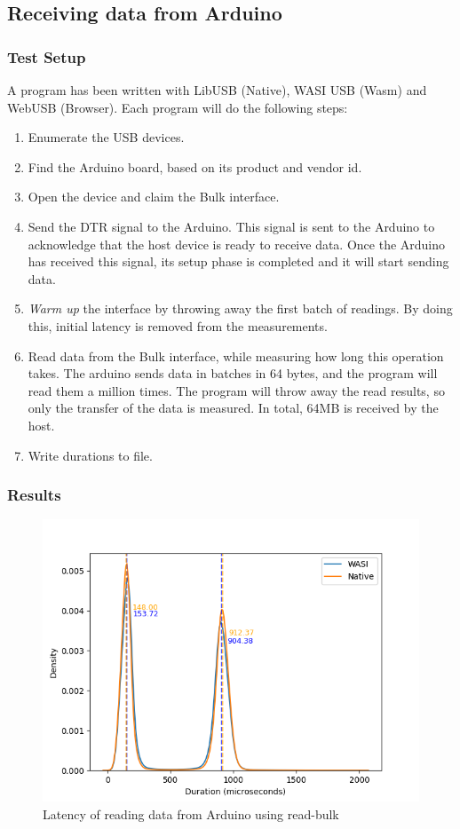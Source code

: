 \subsection{Receiving data from Arduino}

\subsubsection{Test Setup}
A program has been written with LibUSB (Native), WASI USB (Wasm) and WebUSB (Browser). Each program will do the following steps:

\begin{enumerate}
\item Enumerate the USB devices.
\item Find the Arduino board, based on its product and vendor id.
\item Open the device and claim the Bulk interface.
\item Send the \acrfull{DTR} signal to the Arduino. This signal is sent to the Arduino to acknowledge that the host device is ready to receive data. Once the Arduino has received this signal, its setup phase is completed and it will start sending data.
\item \textit{Warm up } the interface by throwing away the first batch of readings. By doing this, initial latency is removed from the measurements.
\item Read data from the Bulk interface, while measuring how long this operation takes. The arduino sends data in batches in 64 bytes, and the program will read them a million times. The program will throw away the read results, so only the transfer of the data is measured. In total, 64MB is received by the host.
\item Write durations to file.
\end{enumerate}

\subsubsection{Results}
\begin{figure}[H]
  \centering
  \includegraphics[width=1\textwidth]{images/reading_data_latency.png}
  \caption{Latency of reading data from Arduino using read-bulk}
  \label{fig:arduino_reading_latency}
\end{figure}

